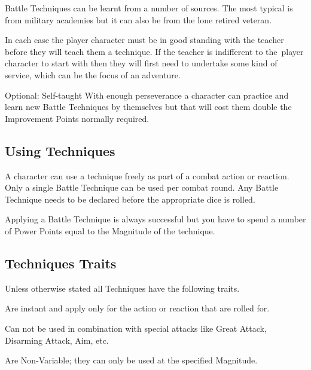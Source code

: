 Battle Techniques can be learnt from a number of sources. The most typical is from military academies but it can also be from the lone retired veteran. 

In each case the player character must be in good standing with the teacher before they will teach them a technique. If the teacher is indifferent to the player character to start with then they will first need to undertake some kind of service, which can be the focus of an adventure.

\vspace{1em}

\begin{rpg-titlebox}{Optional: Self-taught}
With enough perseverance a character can practice and learn new Battle Techniques by themselves but that will cost them double the Improvement Points normally required.
\end{rpg-titlebox}

\subsection{Using Techniques}
A character can use a technique freely as part of a combat action or reaction. Only a single Battle Technique can be used per combat round. Any Battle Technique needs to be declared before the appropriate dice is rolled.

Applying a Battle Technique is always successful but you have to spend a number of Power Points equal to the Magnitude of the technique.


\subsection{Techniques Traits}
Unless otherwise stated all Techniques have the following traits.

\begin{rpg-list}
\item Are instant and apply only for the action or reaction that are rolled for.
\item Can not be used in combination with special attacks like Great Attack, Disarming Attack, Aim, etc.
\item Are Non-Variable; they can only be used at the specified Magnitude.
\end{rpg-list}


